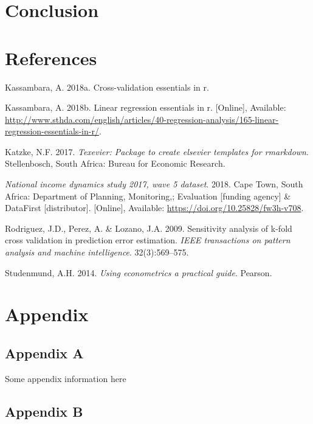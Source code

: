 \documentclass[11pt,preprint, authoryear]{elsarticle}
\numberwithin{equation}{section}
\numberwithin{figure}{section}
\numberwithin{table}{section}
\newlength{\cslhangindent}
\newenvironment{CSLReferences}%
  {\setlength{\parindent}{0pt}%
  \everypar{\setlength{\hangindent}{\cslhangindent}}\ignorespaces}%
  {\par}
\begin{document}
\hypertarget{conclusion}{%
\section{Conclusion}\label{conclusion}}

\newpage

\hypertarget{references}{%
\section*{References}\label{references}}

\hypertarget{refs}{}
\begin{CSLReferences}{1}{0}
\leavevmode\hypertarget{ref-k}{}%
Kassambara, A. 2018a. Cross-validation essentials in r.

\leavevmode\hypertarget{ref-rmse}{}%
Kassambara, A. 2018b. Linear regression essentials in r. {[}Online{]},
Available:
\url{http://www.sthda.com/english/articles/40-regression-analysis/165-linear-regression-essentials-in-r/}.

\leavevmode\hypertarget{ref-Texevier}{}%
Katzke, N.F. 2017. \emph{{Texevier}: {P}ackage to create elsevier
templates for rmarkdown}. Stellenbosch, South Africa: Bureau for
Economic Research.

\leavevmode\hypertarget{ref-nids}{}%
\emph{National income dynamics study 2017, wave 5 dataset}. 2018. Cape
Town, South Africa: Department of Planning, Monitoring,; Evaluation
{[}funding agency{]} \& DataFirst {[}distributor{]}. {[}Online{]},
Available: \url{https://doi.org/10.25828/fw3h-v708}.

\leavevmode\hypertarget{ref-kfold}{}%
Rodriguez, J.D., Perez, A. \& Lozano, J.A. 2009. Sensitivity analysis of
k-fold cross validation in prediction error estimation. \emph{IEEE
transactions on pattern analysis and machine intelligence}.
32(3):569--575.

\leavevmode\hypertarget{ref-econ}{}%
Studenmund, A.H. 2014. \emph{Using econometrics a practical guide}.
Pearson.

\end{CSLReferences}

\hypertarget{appendix}{%
\section*{Appendix}\label{appendix}}

\hypertarget{appendix-a}{%
\subsection*{Appendix A}\label{appendix-a}}

Some appendix information here

\hypertarget{appendix-b}{%
\subsection*{Appendix B}\label{appendix-b}}


\end{document}
